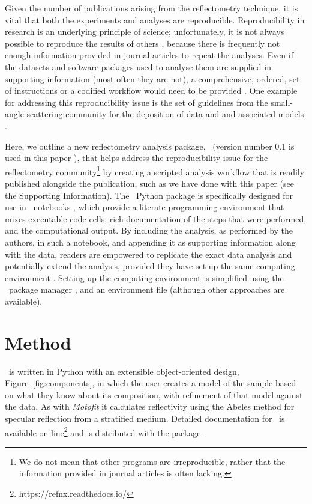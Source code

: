 \documentclass[pdf,preprint]{article}
\begin{document}
Given the number of publications arising from the reflectometry technique, it is vital that both the experiments and analyses are reproducible.
Reproducibility in research is an underlying principle of science; unfortunately, it is not always possible to reproduce the results of others \cite{Stark2018}, because there is frequently not enough information provided in journal articles to repeat the analyses. Even if the datasets and software packages used to analyse them are supplied in supporting information (most often they are not), a comprehensive, ordered, set of instructions or a codified workflow would need to be provided \cite{Moeller2017a}.
One example for addressing this reproducibility issue is the set of guidelines from the small-angle scattering community for the deposition of data and and associated models \cite{Trewhella:jc5010, pauw2013}.

Here, we outline a new reflectometry analysis package, \ (version number 0.1 is used in this paper \cite{refnx}), that helps address the reproducibility issue for the reflectometry community\footnote{We do not mean that other programs are irreproducible, rather that the information provided in journal articles is often lacking.} by creating a scripted analysis workflow that is readily published alongside the publication, such as we have done with this paper (see the Supporting Information).
The \ Python package is specifically designed for use in \Jupyter\ notebooks \cite{Kluyver:2016aa}, which provide a literate programming environment that mixes executable code cells, rich documentation of the steps that were performed, and the computational output. By including the analysis, as performed by the authors, in such a notebook, and appending it as supporting information along with the data, readers are empowered to replicate the exact data analysis and potentially extend the analysis, provided they have set up the same computing environment \cite{Millman2014}. Setting up the computing environment is simplified using the \conda\ package manager \cite{conda}, and an environment file (although other approaches are available).

\section{Method}

\ is written in Python with an extensible object-oriented design, Figure~\ref{fig:components}, in which the user creates a model of the sample based on what they know about its composition, with refinement of that model against the data. As with \emph{Motofit} \cite{Nelson2006} it calculates reflectivity using the Abeles method \cite{Heavens1955} for specular reflection from a stratified medium.
Detailed documentation for \ is available on-line\footnote{https://refnx.readthedocs.io/} and is distributed with the package.
\end{document}
